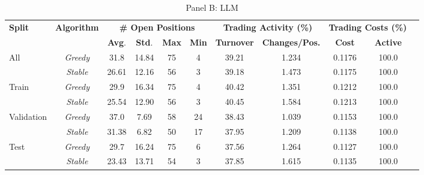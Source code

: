 \begin{table}[htbp]
\begin{subtable}{\textwidth}
\caption{Panel B: LLM}
\centering
{\small
\begin{tabular}{lcccccccccc}
\toprule
\textbf{Split} & \textbf{Algorithm} & \multicolumn{4}{c}{\textbf{\# Open Positions}} & \multicolumn{2}{c}{\textbf{Trading Activity (\%)}} & \multicolumn{2}{c}{\textbf{Trading Costs (\%)}} \\
\cmidrule(lr{0.6em}){3-6} \cmidrule(lr{0.6em}){7-8} \cmidrule(lr{0.6em}){9-10}
& & \textbf{Avg}. & \textbf{Std}. & \textbf{Max} & \textbf{Min} & \textbf{Turnover} & \textbf{Changes/Pos.} & \textbf{Cost} & \textbf{Active} \\
\midrule
\multirow{2}{*}{All} & \textit{Greedy} & 31.8 & 14.84 & 75 & 4 & 39.21 & 1.234 & 0.1176 & 100.0 \\
 & \textit{Stable} & 26.61 & 12.16 & 56 & 3 & 39.18 & 1.473 & 0.1175 & 100.0 \\
\midrule
\multirow{2}{*}{Train} & \textit{Greedy} & 29.9 & 16.34 & 75 & 4 & 40.42 & 1.351 & 0.1212 & 100.0 \\
 & \textit{Stable} & 25.54 & 12.90 & 56 & 3 & 40.45 & 1.584 & 0.1213 & 100.0 \\
\midrule
\multirow{2}{*}{Validation} & \textit{Greedy} & 37.0 & 7.69 & 58 & 24 & 38.43 & 1.039 & 0.1153 & 100.0 \\
 & \textit{Stable} & 31.38 & 6.82 & 50 & 17 & 37.95 & 1.209 & 0.1138 & 100.0 \\
\midrule
\multirow{2}{*}{Test} & \textit{Greedy} & 29.7 & 16.24 & 75 & 6 & 37.56 & 1.264 & 0.1127 & 100.0 \\
 & \textit{Stable} & 23.43 & 13.71 & 54 & 3 & 37.85 & 1.615 & 0.1135 & 100.0 \\
\bottomrule
\end{tabular}
}
\end{subtable}


\end{table}
